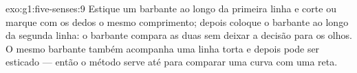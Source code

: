 \begin{solution}{exo:g1:five-senses:9}
Estique um barbante ao longo da primeira linha e corte ou marque com
os dedos o mesmo comprimento; depois coloque o barbante ao longo da
segunda linha: o barbante compara as duas sem deixar a decisão para
os olhos. O mesmo barbante também acompanha uma linha torta e depois
pode ser esticado --- então o método serve até para comparar uma
curva com uma reta.
\end{solution}
